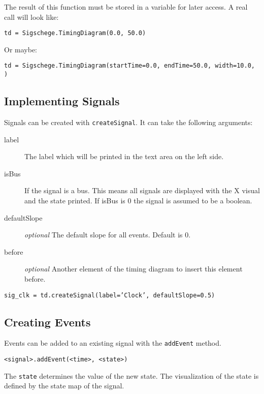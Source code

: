 \documentclass[11pt]{article}
\begin{document}
The result of this function must be stored in a variable for later access. A real call will
look like:

\begin{center}
  \texttt{td = Sigschege.TimingDiagram(0.0, 50.0)}
\end{center}

Or maybe:

\begin{center}
  \texttt{td = Sigschege.TimingDiagram(startTime=0.0, endTime=50.0, width=10.0, )}
\end{center}

\subsection{Implementing Signals}
\label{sec:sig}

Signals can be created with \texttt{createSignal}. It can take the following
arguments:

\begin{description}
\item[label] The label which will be printed in the text area on the left side.
\item[isBus] If the signal is a bus. This means all signals are displayed with the X visual
and the state printed. If isBus is 0 the signal is assumed to be a boolean. 
\item[defaultSlope] \emph{optional} The default slope for all events. Default is 0.
\item[before] \emph{optional} Another element of the timing diagram to insert this element before.  
\end{description}

\begin{center}
  \texttt{sig\_clk = td.createSignal(label='Clock', defaultSlope=0.5)}
\end{center}

\subsection{Creating Events}
\label{sec:evt}

Events can be added to an existing signal with the \texttt{addEvent} method.

\texttt{<signal>.addEvent(<time>, <state>)}

The \texttt{state} determines the value of the new state. The visualization of
the state is defined by the state map of the signal. 
\end{document}
